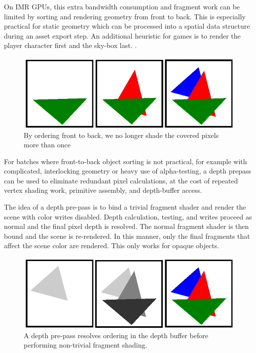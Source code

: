 On IMR GPUs, this extra bandwidth consumption and fragment work can be limited
by sorting and rendering geometry from front to back.  This is especially
practical for static geometry which can be processed into a spatial data
structure during an asset export step.  An additional heuristic for games is to
render the player character first and the sky-box last.
\cite{Pranckevicius11a}.  

\begin{figure}[h!]
    \caption{By ordering front to back, we no longer shade the covered pixels more than once}
    \centering
        \includegraphics{mccaffreyFigs/order_front_to_back.eps}
\end{figure}

For batches where front-to-back object sorting is not
practical, for example with complicated, interlocking geometry or heavy use of
alpha-testing, a depth prepass can be used to eliminate redundant pixel
calculations, at the cost of repeated vertex shading work, primitive assembly,
and depth-buffer access.

The idea of a depth pre-pass is to bind a trivial fragment shader and render
the scene with color writes disabled.  Depth calculation, testing, and writes
proceed as normal and the final pixel depth is resolved.  The normal
fragment shader is then bound and the scene is re-rendered.  In this manner,
only the final fragments that affect the scene color are rendered.  This only
works for opaque objects.

\begin{figure}[h!]
    \caption{A depth pre-pass resolves ordering in the depth buffer before performing non-trivial fragment shading.}
    \centering
        \includegraphics{mccaffreyFigs/depth_pre_pass.eps}
\end{figure}

